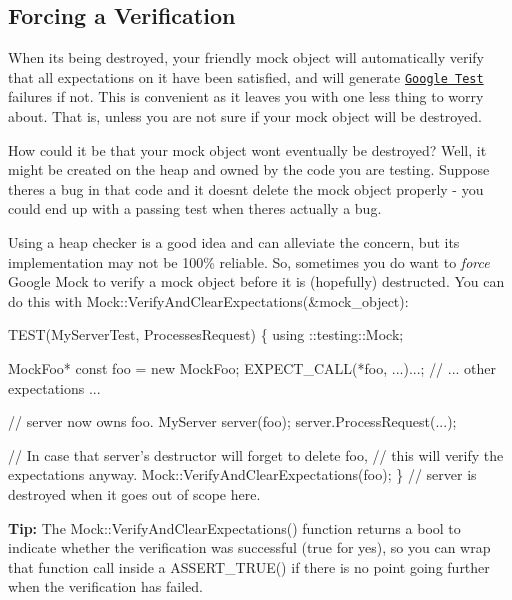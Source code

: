 \subsection*{Forcing a Verification}

When it\textquotesingle{}s being destroyed, your friendly mock object will automatically verify that all expectations on it have been satisfied, and will generate \href{../../googletest/}{\tt Google Test} failures if not. This is convenient as it leaves you with one less thing to worry about. That is, unless you are not sure if your mock object will be destroyed.

How could it be that your mock object won\textquotesingle{}t eventually be destroyed? Well, it might be created on the heap and owned by the code you are testing. Suppose there\textquotesingle{}s a bug in that code and it doesn\textquotesingle{}t delete the mock object properly -\/ you could end up with a passing test when there\textquotesingle{}s actually a bug.

Using a heap checker is a good idea and can alleviate the concern, but its implementation may not be 100\% reliable. So, sometimes you do want to {\itshape force} Google Mock to verify a mock object before it is (hopefully) destructed. You can do this with {\ttfamily Mock\+::\+Verify\+And\+Clear\+Expectations(\&mock\+\_\+object)}\+:


\begin{DoxyCode}
TEST(MyServerTest, ProcessesRequest) \{
  using ::testing::Mock;

  MockFoo* \textcolor{keyword}{const} foo = \textcolor{keyword}{new} MockFoo;
  EXPECT\_CALL(*foo, ...)...;
  \textcolor{comment}{// ... other expectations ...}

  \textcolor{comment}{// server now owns foo.}
  MyServer server(foo);
  server.ProcessRequest(...);

  \textcolor{comment}{// In case that server's destructor will forget to delete foo,}
  \textcolor{comment}{// this will verify the expectations anyway.}
  Mock::VerifyAndClearExpectations(foo);
\}  \textcolor{comment}{// server is destroyed when it goes out of scope here.}
\end{DoxyCode}


{\bfseries Tip\+:} The {\ttfamily Mock\+::\+Verify\+And\+Clear\+Expectations()} function returns a {\ttfamily bool} to indicate whether the verification was successful ({\ttfamily true} for yes), so you can wrap that function call inside a {\ttfamily A\+S\+S\+E\+R\+T\+\_\+\+T\+R\+U\+E()} if there is no point going further when the verification has failed.

